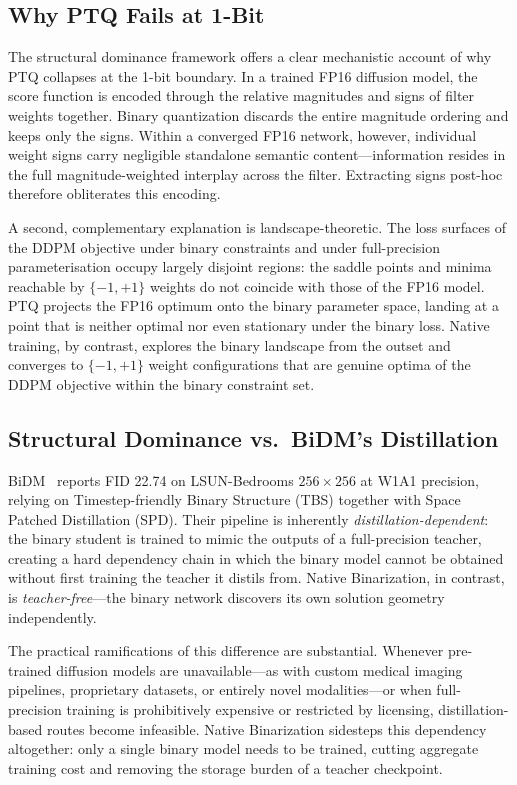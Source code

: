 \documentclass[twocolumn, journal]{IEEEtran}
\begin{document}
\subsection{Why PTQ Fails at 1-Bit}

The structural dominance framework offers a clear mechanistic account of why PTQ
collapses at the 1-bit boundary. In a trained FP16 diffusion model, the score function
is encoded through the relative magnitudes and signs of filter weights together. Binary
quantization discards the entire magnitude ordering and keeps only the signs. Within a
converged FP16 network, however, individual weight signs carry negligible standalone
semantic content---information resides in the full magnitude-weighted interplay across
the filter. Extracting signs post-hoc therefore obliterates this encoding.

A second, complementary explanation is landscape-theoretic. The loss surfaces of the
DDPM objective under binary constraints and under full-precision parameterisation occupy
largely disjoint regions: the saddle points and minima reachable by $\{-1,+1\}$ weights
do not coincide with those of the FP16 model. PTQ projects the FP16 optimum onto the
binary parameter space, landing at a point that is neither optimal nor even stationary
under the binary loss. Native training, by contrast, explores the binary landscape from
the outset and converges to $\{-1,+1\}$ weight configurations that are genuine optima
of the DDPM objective within the binary constraint set.

\subsection{Structural Dominance vs.\ BiDM's Distillation}

BiDM~\cite{bidm2024} reports FID 22.74 on LSUN-Bedrooms $256{\times}256$ at W1A1
precision, relying on Timestep-friendly Binary Structure (TBS) together with Space
Patched Distillation (SPD). Their pipeline is inherently \emph{distillation-dependent}:
the binary student is trained to mimic the outputs of a full-precision teacher, creating
a hard dependency chain in which the binary model cannot be obtained without first
training the teacher it distils from. Native Binarization, in contrast, is
\emph{teacher-free}---the binary network discovers its own solution geometry
independently.

The practical ramifications of this difference are substantial. Whenever pre-trained
diffusion models are unavailable---as with custom medical imaging pipelines, proprietary
datasets, or entirely novel modalities---or when full-precision training is prohibitively
expensive or restricted by licensing, distillation-based routes become infeasible. Native
Binarization sidesteps this dependency altogether: only a single binary model needs to be
trained, cutting aggregate training cost and removing the storage burden of a teacher
checkpoint.
\end{document}
